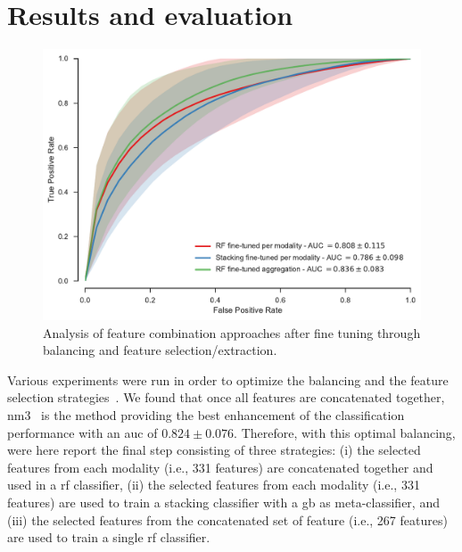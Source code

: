 \section{Results and evaluation} \label{sc:results}
\begin{figure}
\centering
 \includegraphics[width=0.9\linewidth]{Figures/combine_all.pdf}
  \caption[Analysis of feature combination approaches after fine
  tuning.]{Analysis of feature combination approaches after fine
    tuning through balancing and feature selection/extraction.}
  \label{fig:res-Ex4}
\end{figure}

Various experiments were run in order to optimize the balancing and
the feature selection strategies~\cite{Lemaitre2016thesis}.
We found that once all features are concatenated together,
\ac{nm3}~\cite{mani2003knn} is the method providing the best
enhancement of the classification performance with an \ac{auc} of $0.824 \pm
0.076$.
Therefore, with this optimal balancing, were here report the
final step consisting of three strategies:
(i) the selected features from each modality (i.e., 331 features) are
concatenated together and used in a \ac{rf} classifier,
(ii) the selected features from each modality (i.e., 331 features) are
used to train a stacking classifier with a \ac{gb} as meta-classifier, and
(iii) the selected features from the concatenated set of feature
(i.e., 267 features) are used to train a single \ac{rf} classifier.

